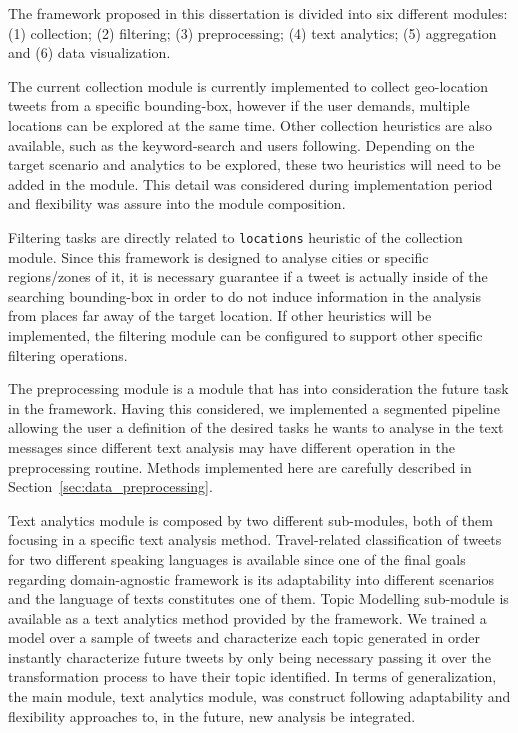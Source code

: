 The framework proposed in this dissertation is divided into six different modules: (1) collection; (2) filtering; (3) preprocessing; (4) text analytics; (5) aggregation and (6) data visualization.

The current collection module is currently implemented to collect geo-location tweets from a specific bounding-box, however if the user demands, multiple locations can be explored at the same time. Other collection heuristics are also available, such as the keyword-search and users following. Depending on the target scenario and analytics to be explored, these two heuristics will need to be added in the module. This detail was considered during implementation period and flexibility was assure into the module composition.

Filtering tasks are directly related to \texttt{locations} heuristic of the collection module. Since this framework is designed to analyse cities or specific regions/zones of it, it is necessary guarantee if a tweet is actually inside of the searching bounding-box in order to do not induce information in the analysis from places far away of the target location. If other heuristics will be implemented, the filtering module can be configured to support other specific filtering operations.

The preprocessing module is a module that has into consideration the future task in the framework. Having this considered, we implemented a segmented pipeline allowing the user a definition of the desired tasks he wants to analyse in the text messages since different text analysis may have different operation in the preprocessing routine. Methods implemented here are carefully described in Section~\ref{sec:data_preprocessing}.

Text analytics module is composed by two different sub-modules, both of them focusing in a specific text analysis method. Travel-related classification of tweets for two different speaking languages is available since one of the final goals regarding domain-agnostic framework is its adaptability into different scenarios and the language of texts constitutes one of them. Topic Modelling sub-module is available as a text analytics method provided by the framework. We trained a model over a sample of tweets and characterize each topic generated in order instantly characterize future tweets by only being necessary passing it over the transformation process to have their topic identified.
In terms of generalization, the main module, text analytics module, was construct following adaptability and flexibility approaches to, in the future, new analysis be integrated.

